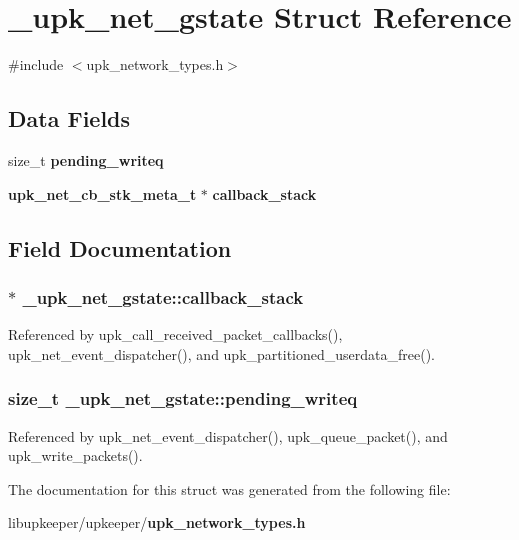 \section{\_\-upk\_\-net\_\-gstate Struct Reference}
\label{struct__upk__net__gstate}


{\ttfamily \#include $<$upk\_\-network\_\-types.h$>$}

\subsection*{Data Fields}
\begin{DoxyCompactItemize}
\item 
size\_\-t {\bf pending\_\-writeq}
\item 
{\bf upk\_\-net\_\-cb\_\-stk\_\-meta\_\-t} $\ast$ {\bf callback\_\-stack}
\end{DoxyCompactItemize}


\subsection{Field Documentation}
\subsubsection[{callback\_\-stack}]{$\ast$ {\bf \_\-upk\_\-net\_\-gstate::callback\_\-stack}}\label{struct__upk__net__gstate_a19719d22c5e8f56e6a8f72856d3a2135}


Referenced by upk\_\-call\_\-received\_\-packet\_\-callbacks(), upk\_\-net\_\-event\_\-dispatcher(), and upk\_\-partitioned\_\-userdata\_\-free().

\subsubsection[{pending\_\-writeq}]{\setlength{\rightskip}{0pt plus 5cm}size\_\-t {\bf \_\-upk\_\-net\_\-gstate::pending\_\-writeq}}\label{struct__upk__net__gstate_a3151202ecedf334aa72dd2401bc7f7bb}


Referenced by upk\_\-net\_\-event\_\-dispatcher(), upk\_\-queue\_\-packet(), and upk\_\-write\_\-packets().



The documentation for this struct was generated from the following file:\begin{DoxyCompactItemize}
\item 
libupkeeper/upkeeper/{\bf upk\_\-network\_\-types.h}\end{DoxyCompactItemize}
